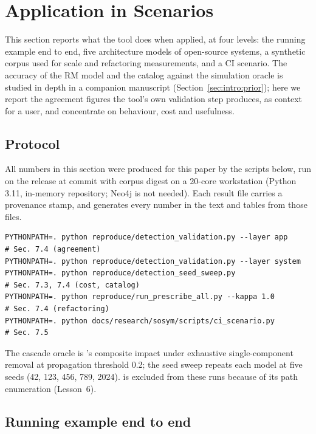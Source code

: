 \section{Application in Scenarios}
\label{sec:application}

This section reports what the tool does when applied, at four levels: the running example end to end, five architecture models of open-source systems, a synthetic corpus used for scale and refactoring measurements, and a CI scenario. The accuracy of the RM model and the catalog against the simulation oracle is studied in depth in a companion manuscript (Section~\ref{sec:intro:prior}); here we report the agreement figures the tool's own validation step produces, as context for a user, and concentrate on behaviour, cost and usefulness.

\subsection{Protocol}
\label{sec:app:protocol}

All numbers in this section were produced for this paper by the scripts below, run on the release at commit \code{\ProvCommit} with corpus digest \code{\ProvCorpus} on a 20-core workstation (Python 3.11, in-memory repository; Neo4j is not needed). Each result file carries a provenance stamp, and  generates every number in the text and tables from those files.
\begin{lstlisting}
PYTHONPATH=. python reproduce/detection_validation.py --layer app     # Sec. 7.4 (agreement)
PYTHONPATH=. python reproduce/detection_validation.py --layer system
PYTHONPATH=. python reproduce/detection_seed_sweep.py                 # Sec. 7.3, 7.4 (cost, catalog)
PYTHONPATH=. python reproduce/run_prescribe_all.py --kappa 1.0        # Sec. 7.4 (refactoring)
PYTHONPATH=. python docs/research/sosym/scripts/ci_scenario.py         # Sec. 7.5
\end{lstlisting}
The cascade oracle is 's composite impact under exhaustive single-component removal at propagation threshold 0.2; the seed sweep repeats each model at five seeds (42, 123, 456, 789, 2024).  is excluded from these runs because of its path enumeration (Lesson~6).

\subsection{Running example end to end}
\label{sec:app:example}

